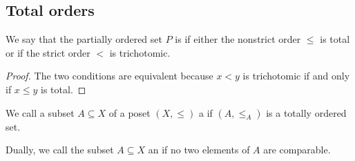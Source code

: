 \subsection{Total orders}\label{subsec:total_orders}

\begin{definition}\label{def:totally_ordered_set}
  We say that the partially ordered set \( P \) is  if either the nonstrict order \( \leq \) is total or if the strict order \( < \) is trichotomic.
\end{definition}
\begin{proof}
  The two conditions are equivalent because \( x < y \) is trichotomic if and only if \( x \leq y \) is total.
\end{proof}

\begin{definition}\label{def:poset_chain}
  We call a subset \( A \subseteq X \) of a poset \( (X, \leq) \) a  if \( (A, \leq_A) \) is a totally ordered set.

  Dually, we call the subset \( A \subseteq X \) an  if no two elements of \( A \) are comparable.
\end{definition}

